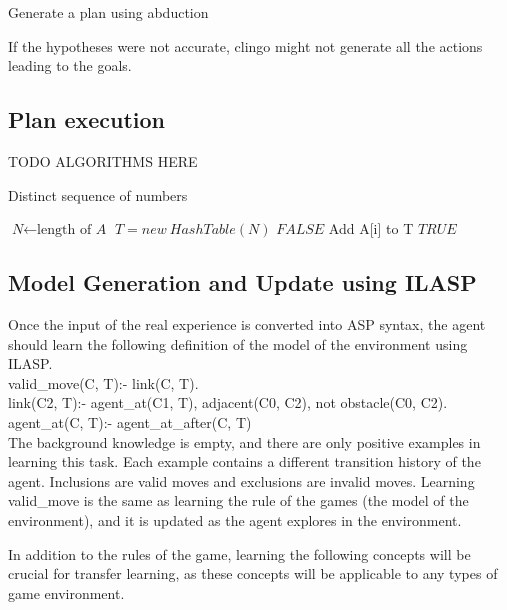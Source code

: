 Generate a plan using abduction

If the hypotheses were not accurate, clingo might not generate all the actions leading to the goals. 

\subsection{Plan execution}
\label{Plan execution}
TODO ALGORITHMS HERE

\begin{algorithm}
\caption{Distinct sequence of numbers}\label{euclid}
\begin{algorithmic}[1]
\State $\textit{N} \gets \text{length of }\textit{A}$
\State $\textit{T} = new\ HashTable(N)$
        \State \Return $FALSE$
    \Else 
        \State Add A[i] to T   
    \EndIf
\EndFor
\State \Return $TRUE$
\EndProcedure
\end{algorithmic}
\end{algorithm}
    


\subsection{Model Generation and Update using ILASP}
\label{model_generation_and_update}
Once the input of the real experience is converted into ASP syntax, the agent should learn the following definition of the model of the environment using ILASP. \\

valid\_move(C, T):- link(C, T).
\\
link(C2, T):- agent\_at(C1, T), adjacent(C0, C2), not obstacle(C0, C2).\\
agent\_at(C, T):- agent\_at\_after(C, T) \\

The background knowledge is empty, and there are only positive examples in learning this task. Each example contains a different transition history of the agent. 
Inclusions are valid moves and exclusions are invalid moves. 
Learning valid\_move is the same as learning the rule of the games (the model of the environment), and it is updated as the agent explores in the environment.

In addition to the rules of the game, learning the following concepts will be crucial for transfer learning, as these concepts will be applicable to any types of game environment.  \\

